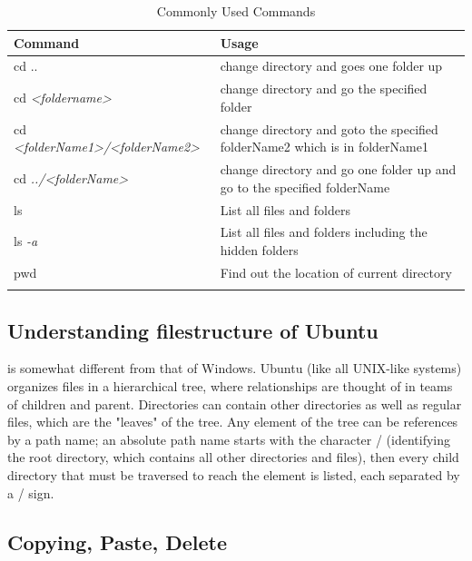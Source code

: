 \documentclass{tufte-book} %
\begin{document}
\begin{table}[center]
  \centering
  \begin{tabular}{ll}
    \toprule
    Command & Usage \\
    \midrule
    cd .. & change directory and goes one folder up \\
    cd \textit{<foldername>} & change directory and go the specified folder \\
    cd \textit{<folderName1>/<folderName2>} & change directory and goto the specified folderName2 which is in folderName1 \\
    cd \textit{../<folderName>} & change directory and go one folder up and go to the specified folderName \\
    ls & List all files and folders \\
    ls \textit{-a} & List all files and folders including the hidden folders \\
    pwd & Find out the location of current directory \\
    
    \bottomrule
  \caption{Commonly Used Commands}
     
  \end{tabular}
  \label{command0}

\end{table}


\subsection{Understanding filestructure of Ubuntu}
 is somewhat different from that of Windows. Ubuntu (like all UNIX-like systems) organizes files in a hierarchical tree, where relationships are thought of in teams of children and parent. Directories can contain other directories as well as regular files, which are the "leaves" of the tree. Any element of the tree can be references by a path name; an absolute path name starts with the character / (identifying the root directory, which contains all other directories and files), then every child directory that must be traversed to reach the element is listed, each separated by a / sign.


\subsection[Copy, Paste, Delete]{Copying, Paste, Delete}
\end{document}

